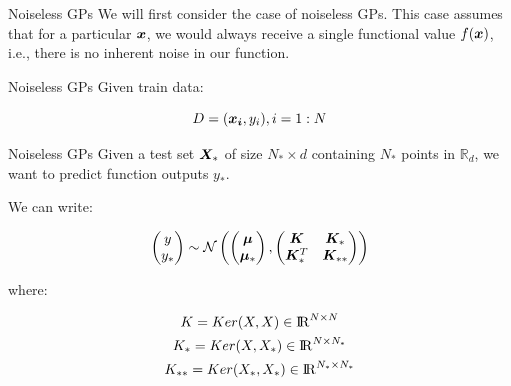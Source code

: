 \documentclass{beamer}
\begin{document}
\begin{frame}{Noiseless GPs}
		We will first consider the case of noiseless GPs. This case assumes that for a particular $\bm{x}$, we would always receive a single functional value $f(\bm{x})$, i.e., there is no inherent noise in our function.
\end{frame}

\begin{frame}{Noiseless GPs}
		Given train data:
		
		$$D = {(\bm{x_i}, y_i), i = 1:N}$$
\end{frame}

\begin{frame}{Noiseless GPs}
	Given a test set $\bm{X}_{\ast}$ of size $N_{\ast} \times d$ containing $N_{\ast}$ points in $\mathbb{R}_d$, we want to predict function outputs $y_{\ast}$.

	We can write:

	$$\begin{pmatrix}
	y \\
	y_*
	\end{pmatrix}  \sim \mathcal{N} \left( \begin{pmatrix}
	\bm{\mu} \\
	\bm{\mu}_*
	\end{pmatrix} , \begin{pmatrix}
	\bm{K} & \bm{K}_* \\
	\bm{K}_*^T & \bm{K}_{**}
	\end{pmatrix} \right)$$
	
	where:
	
	\begin{gather}
	K = Ker(X, X) \in {\rm I\!R}^{N\times N} \label{eq1}\\
	K_* = Ker(X, X_*) \in {\rm I\!R}^{N\times N_*} \label{eq2}\\
	K_{**} = Ker(X_*, X_*) \in {\rm I\!R}^{N_*\times N_*} \label{eq3}
	\end{gather}
\end{frame}
\end{document}
